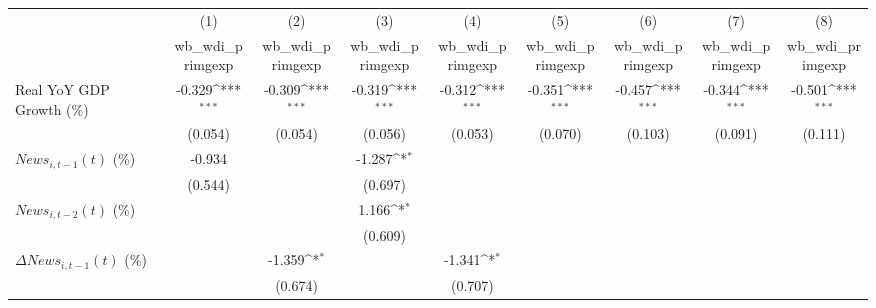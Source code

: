 {
\def\sym#1{\ifmmode^{#1}\else\(^{#1}\)\fi}
\begin{tabular}{l*{8}{c}}
\toprule
                    &\multicolumn{1}{c}{(1)}&\multicolumn{1}{c}{(2)}&\multicolumn{1}{c}{(3)}&\multicolumn{1}{c}{(4)}&\multicolumn{1}{c}{(5)}&\multicolumn{1}{c}{(6)}&\multicolumn{1}{c}{(7)}&\multicolumn{1}{c}{(8)}\\
                    &\multicolumn{1}{c}{wb_wdi_primgexp}&\multicolumn{1}{c}{wb_wdi_primgexp}&\multicolumn{1}{c}{wb_wdi_primgexp}&\multicolumn{1}{c}{wb_wdi_primgexp}&\multicolumn{1}{c}{wb_wdi_primgexp}&\multicolumn{1}{c}{wb_wdi_primgexp}&\multicolumn{1}{c}{wb_wdi_primgexp}&\multicolumn{1}{c}{wb_wdi_primgexp}\\
\midrule
Real YoY GDP Growth (\%)&      -0.329\sym{***}&      -0.309\sym{***}&      -0.319\sym{***}&      -0.312\sym{***}&      -0.351\sym{***}&      -0.457\sym{***}&      -0.344\sym{***}&      -0.501\sym{***}\\
                    &     (0.054)         &     (0.054)         &     (0.056)         &     (0.053)         &     (0.070)         &     (0.103)         &     (0.091)         &     (0.111)         \\
\addlinespace
$ News_{i,t-1}(t)$ (\%)&      -0.934         &                     &      -1.287\sym{*}  &                     &                     &                     &                     &                     \\
                    &     (0.544)         &                     &     (0.697)         &                     &                     &                     &                     &                     \\
\addlinespace
$ News_{i,t-2}(t)$ (\%)&                     &                     &       1.166\sym{*}  &                     &                     &                     &                     &                     \\
                    &                     &                     &     (0.609)         &                     &                     &                     &                     &                     \\
\addlinespace
$ \Delta News_{i,t-1}(t)$ (\%)&                     &      -1.359\sym{*}  &                     &      -1.341\sym{*}  &                     &                     &                     &                     \\
                    &                     &     (0.674)         &                     &     (0.707)         &                     &                     &                     &                     \\

\end{tabular}}
